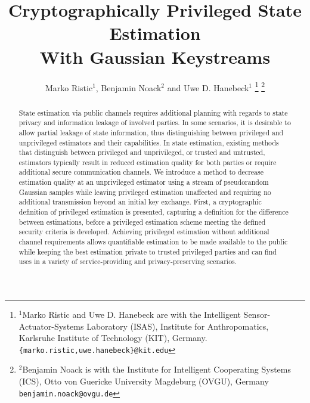 \documentclass[letterpaper, 10 pt, conference]{ieeeconf}
\title{\LARGE \bf
Cryptographically Privileged State Estimation\\With Gaussian Keystreams
}
\author{Marko Ristic$^{1}$, Benjamin Noack$^{2}$ and Uwe D. Hanebeck$^{1}$%
\thanks{$^{1}$Marko Ristic and Uwe D. Hanebeck are with the Intelligent Sensor-Actuator-Systems Laboratory (ISAS), Institute for Anthropomatics, Karlsruhe Institute of Technology (KIT), Germany.\newline
{\tt\small \{marko.ristic,uwe.hanebeck\}@kit.edu}%
}%
\thanks{$^{2}$Benjamin Noack is with the Institute for Intelligent Cooperating Systems (ICS),
Otto von Guericke University Magdeburg (OVGU), Germany\newline
{\tt\small benjamin.noack@ovgu.de}%
}%
}
\begin{document}
\maketitle
\thispagestyle{empty}
\pagestyle{empty}


% 
%                                                                                             
%                                                                                             
%                                                                                             
% 

\begin{abstract}
State estimation via public channels requires additional planning with regards to state privacy and information leakage of involved parties. In some scenarios, it is desirable to allow partial leakage of state information, thus distinguishing between privileged and unprivileged estimators and their capabilities. In state estimation, existing methods that distinguish between privileged and unprivileged, or trusted and untrusted, estimators typically result in reduced estimation quality for both parties or require additional secure communication channels. We introduce a method to decrease estimation quality at an unprivileged estimator using a stream of pseudorandom Gaussian samples while leaving privileged estimation unaffected and requiring no additional transmission beyond an initial key exchange. First, a cryptographic definition of privileged estimation is presented, capturing a definition for the difference between estimations, before a privileged estimation scheme meeting the defined security criteria is developed. Achieving privileged estimation without additional channel requirements allows quantifiable estimation to be made available to the public while keeping the best estimation private to trusted privileged parties and can find uses in a variety of service-providing and privacy-preserving scenarios.
\end{abstract}
\end{document}
